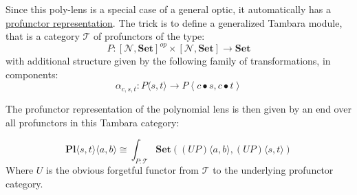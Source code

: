 \documentclass[11pt]{amsart}
\begin{document}
Since this poly-lens is a special case of a general optic, it automatically has a \href{https://arxiv.org/abs/2001.07488}{profunctor representation}. The trick is to define a generalized Tambara module, that is a category $\mathcal{T}$ of profunctors of the type:
\[ P \colon [\mathcal{N}, \mathbf{Set}]^{op}  \times [\mathcal{N}, \mathbf{Set}] \to \mathbf{Set} \]
with additional structure given by the following family of transformations, in components:
\[\alpha_{c, s, t} \colon P\langle s, t \rangle \to P \left \langle c \bullet s, c \bullet t \right \rangle \]

The profunctor representation of the polynomial lens is then given by an end over all profunctors in this Tambara category:

\[  \mathbf{Pl}\langle s, t\rangle \langle a, b\rangle \cong \int_{P \colon \mathcal{T}} \mathbf{Set}\left ( (U P)\langle a, b \rangle, (U P) \langle s, t \rangle \right) \]
Where $U$ is the obvious forgetful functor from $\mathcal{T}$ to the underlying profunctor category.
\end{document}
